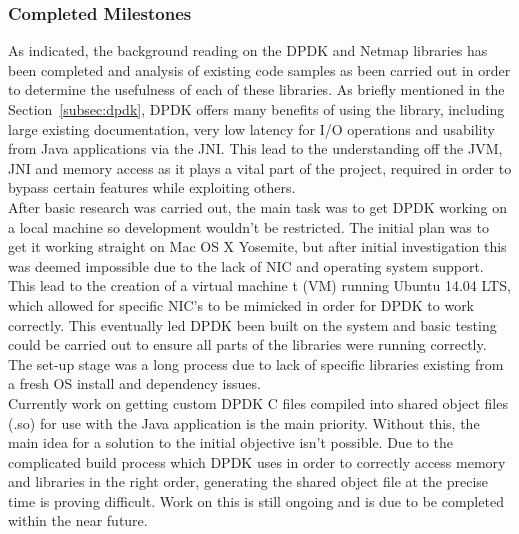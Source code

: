 \documentclass[interim_report.tex]{subfiles}
\begin{document}
\subsubsection{Completed Milestones}
As indicated, the background reading on the DPDK and Netmap libraries has been completed and analysis of existing code samples as been carried out in order to determine the usefulness of each of these libraries. As briefly mentioned in the Section~\ref{subsec:dpdk}, DPDK offers many benefits of using the library, including large existing documentation, very low latency for I/O operations and usability from Java applications via the JNI. This lead to the understanding off the JVM, JNI and memory access as it plays a vital part of the project, required in order to bypass certain features while exploiting others. \\
\newline
After basic research was carried out, the main task was to get DPDK working on a local machine so development wouldn't be restricted. The initial plan was to get it working straight on Mac OS X Yosemite, but after initial investigation this was deemed impossible due to the lack of NIC and operating system support. This lead to the creation of a virtual machine t (VM) running Ubuntu 14.04 LTS, which allowed for specific NIC's to be mimicked in order for DPDK to work correctly. This eventually led DPDK been built on the system and basic testing could be carried out to ensure all parts of the libraries were running correctly. The set-up stage was a long process due to lack of specific libraries existing from a fresh OS install and dependency issues. \\
\newline
Currently work on getting custom DPDK C files compiled into shared object files (.so) for use with the Java application is the main priority. Without this, the main idea for a solution to the initial objective isn't possible. Due to the complicated build process which DPDK uses in order to correctly access memory and libraries in the right order, generating the shared object file at the precise time is proving difficult. Work on this is still ongoing and is due to be completed within the near future.
\end{document}

